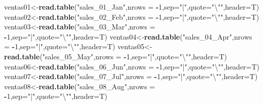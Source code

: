 \documentclass[]{article}
\newenvironment{Shaded}{\begin{snugshade}}{\end{snugshade}}
\newcommand{\KeywordTok}[1]{\textcolor[rgb]{0.13,0.29,0.53}{\textbf{#1}}}
\newcommand{\DataTypeTok}[1]{\textcolor[rgb]{0.13,0.29,0.53}{#1}}
\newcommand{\DecValTok}[1]{\textcolor[rgb]{0.00,0.00,0.81}{#1}}
\newcommand{\CharTok}[1]{\textcolor[rgb]{0.31,0.60,0.02}{#1}}
\newcommand{\StringTok}[1]{\textcolor[rgb]{0.31,0.60,0.02}{#1}}
\newcommand{\OperatorTok}[1]{\textcolor[rgb]{0.81,0.36,0.00}{\textbf{#1}}}
\newcommand{\NormalTok}[1]{#1}
\begin{document}
\begin{Shaded}
\begin{Highlighting}[]
\NormalTok{ventas01<-}\KeywordTok{read.table}\NormalTok{(}\StringTok{"sales_01_Jan"}\NormalTok{,}\DataTypeTok{nrows =} \OperatorTok{-}\DecValTok{1}\NormalTok{,}\DataTypeTok{sep=}\StringTok{"|"}\NormalTok{,}\DataTypeTok{quote=}\StringTok{"}\CharTok{\textbackslash{}"}\StringTok{"}\NormalTok{,}\DataTypeTok{header=}\NormalTok{T)}
\NormalTok{ventas02<-}\KeywordTok{read.table}\NormalTok{(}\StringTok{"sales_02_Feb"}\NormalTok{,}\DataTypeTok{nrows =} \OperatorTok{-}\DecValTok{1}\NormalTok{,}\DataTypeTok{sep=}\StringTok{"|"}\NormalTok{,}\DataTypeTok{quote=}\StringTok{"}\CharTok{\textbackslash{}"}\StringTok{"}\NormalTok{,}\DataTypeTok{header=}\NormalTok{T)}
\NormalTok{ventas03<-}\KeywordTok{read.table}\NormalTok{(}\StringTok{"sales_03_Mar"}\NormalTok{,}\DataTypeTok{nrows =} \OperatorTok{-}\DecValTok{1}\NormalTok{,}\DataTypeTok{sep=}\StringTok{"|"}\NormalTok{,}\DataTypeTok{quote=}\StringTok{"}\CharTok{\textbackslash{}"}\StringTok{"}\NormalTok{,}\DataTypeTok{header=}\NormalTok{T)}
\NormalTok{ventas04<-}\KeywordTok{read.table}\NormalTok{(}\StringTok{"sales_04_Apr"}\NormalTok{,}\DataTypeTok{nrows =} \OperatorTok{-}\DecValTok{1}\NormalTok{,}\DataTypeTok{sep=}\StringTok{"|"}\NormalTok{,}\DataTypeTok{quote=}\StringTok{"}\CharTok{\textbackslash{}"}\StringTok{"}\NormalTok{,}\DataTypeTok{header=}\NormalTok{T)}
\NormalTok{ventas05<-}\KeywordTok{read.table}\NormalTok{(}\StringTok{"sales_05_May"}\NormalTok{,}\DataTypeTok{nrows =} \OperatorTok{-}\DecValTok{1}\NormalTok{,}\DataTypeTok{sep=}\StringTok{"|"}\NormalTok{,}\DataTypeTok{quote=}\StringTok{"}\CharTok{\textbackslash{}"}\StringTok{"}\NormalTok{,}\DataTypeTok{header=}\NormalTok{T)}
\NormalTok{ventas06<-}\KeywordTok{read.table}\NormalTok{(}\StringTok{"sales_06_Jun"}\NormalTok{,}\DataTypeTok{nrows =} \OperatorTok{-}\DecValTok{1}\NormalTok{,}\DataTypeTok{sep=}\StringTok{"|"}\NormalTok{,}\DataTypeTok{quote=}\StringTok{"}\CharTok{\textbackslash{}"}\StringTok{"}\NormalTok{,}\DataTypeTok{header=}\NormalTok{T)}
\NormalTok{ventas07<-}\KeywordTok{read.table}\NormalTok{(}\StringTok{"sales_07_Jul"}\NormalTok{,}\DataTypeTok{nrows =} \OperatorTok{-}\DecValTok{1}\NormalTok{,}\DataTypeTok{sep=}\StringTok{"|"}\NormalTok{,}\DataTypeTok{quote=}\StringTok{"}\CharTok{\textbackslash{}"}\StringTok{"}\NormalTok{,}\DataTypeTok{header=}\NormalTok{T)}
\NormalTok{ventas08<-}\KeywordTok{read.table}\NormalTok{(}\StringTok{"sales_08_Aug"}\NormalTok{,}\DataTypeTok{nrows =} \OperatorTok{-}\DecValTok{1}\NormalTok{,}\DataTypeTok{sep=}\StringTok{"|"}\NormalTok{,}\DataTypeTok{quote=}\StringTok{"}\CharTok{\textbackslash{}"}\StringTok{"}\NormalTok{,}\DataTypeTok{header=}\NormalTok{T)}

\end{Highlighting}
\end{Shaded}
\end{document}
